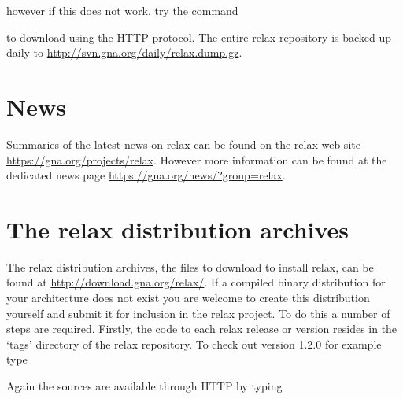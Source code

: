 
however if this does not work, try the command


to download using the HTTP protocol.  The entire relax repository is backed up daily to \href{http://svn.gna.org/daily/relax.dump.gz}{http://svn.gna.org/daily/relax.dump.gz}.




\section{News}

Summaries of the latest news on relax can be found on the relax web site \href{https://gna.org/projects/relax}{https://gna.org/projects/relax}.  However more information can be found at the dedicated news page \href{https://gna.org/news/?group=relax}{https://gna.org/news/?group=relax}.




\section{The relax distribution archives}

The relax distribution archives, the files to download to install relax, can be found at \href{http://download.gna.org/relax/}{http://download.gna.org/relax/}.  If a compiled binary distribution for your architecture does not exist you are welcome to create this distribution yourself and submit it for inclusion in the relax project.  To do this a number of steps are required.  Firstly, the code to each relax release or version resides in the `tags' directory of the relax repository.  To check out version 1.2.0 for example type


Again the sources are available through HTTP by typing



